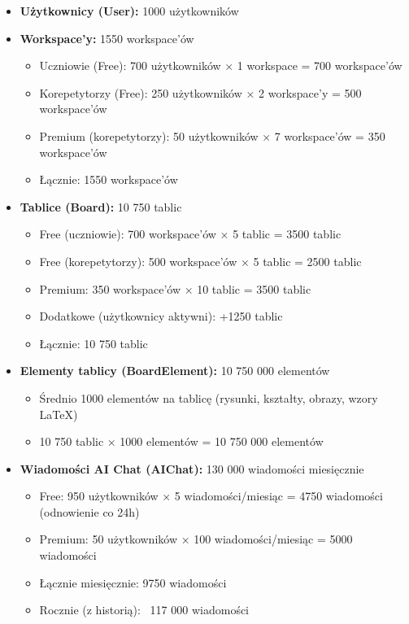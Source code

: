 \documentclass[12pt,a4paper]{article}
\begin{document}
\begin{itemize}[leftmargin=*]
    \item \textbf{Użytkownicy (User):} 1000 użytkowników
    
    \item \textbf{Workspace'y:} 1550 workspace'ów
    \begin{itemize}
        \item Uczniowie (Free): 700 użytkowników × 1 workspace = 700 workspace'ów
        \item Korepetytorzy (Free): 250 użytkowników × 2 workspace'y = 500 workspace'ów
        \item Premium (korepetytorzy): 50 użytkowników × 7 workspace'ów = 350 workspace'ów
        \item Łącznie: 1550 workspace'ów
    \end{itemize}
    
    \item \textbf{Tablice (Board):} 10 750 tablic
    \begin{itemize}
        \item Free (uczniowie): 700 workspace'ów × 5 tablic = 3500 tablic
        \item Free (korepetytorzy): 500 workspace'ów × 5 tablic = 2500 tablic
        \item Premium: 350 workspace'ów × 10 tablic = 3500 tablic
        \item Dodatkowe (użytkownicy aktywni): +1250 tablic
        \item Łącznie: 10 750 tablic
    \end{itemize}
    
    \item \textbf{Elementy tablicy (BoardElement):} 10 750 000 elementów
    \begin{itemize}
        \item Średnio 1000 elementów na tablicę (rysunki, kształty, obrazy, wzory LaTeX)
        \item 10 750 tablic × 1000 elementów = 10 750 000 elementów
    \end{itemize}
    
    \item \textbf{Wiadomości AI Chat (AIChat):} 130 000 wiadomości miesięcznie
    \begin{itemize}
        \item Free: 950 użytkowników × 5 wiadomości/miesiąc = 4750 wiadomości (odnowienie co 24h)
        \item Premium: 50 użytkowników × 100 wiadomości/miesiąc = 5000 wiadomości
        \item Łącznie miesięcznie: 9750 wiadomości
        \item Rocznie (z historią): ~117 000 wiadomości
    \end{itemize}
    

\end{itemize}
\end{document}
